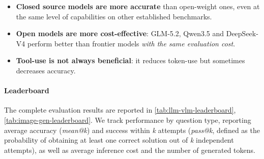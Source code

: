 
\begin{takeawaysbox}
\begin{itemize}[leftmargin=1.5em, topsep=2pt, itemsep=0pt]
    \item \textbf{Closed source models are more accurate} than open-weight ones, even at the same level of capabilities on other established benchmarks.
    \item \textbf{Open models are more cost-effective}: GLM-5.2, Qwen3.5 and DeepSeek-V4 perform better than frontier models \textit{with the same evaluation cost}.
    \item \textbf{Tool-use is not always beneficial}: it reduces token-use but sometimes decreases accuracy.
\end{itemize}
\end{takeawaysbox}


\paragraph{Leaderboard} \label{subsec:leaderboard}
The complete evaluation results are reported in \autoref{tab:llm-vlm-leaderboard}, \autoref{tab:image-gen-leaderboard}. We track performance by question type, reporting average accuracy (\textit{mean@k}) and success within \textit{k} attempts (\textit{pass@k}, defined as the probability of obtaining at least one correct solution out of \textit{k} independent attempts), as well as average inference cost and the number of generated tokens.

% 


